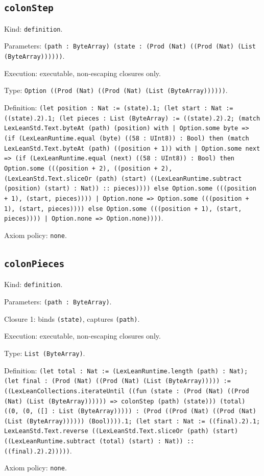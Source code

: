 \documentclass[11pt]{article}
\begin{document}
\subsection*{\texttt{colonStep}}
\noindent Kind: \texttt{definition}.\par
\noindent Parameters: \texttt{(path : ByteArray) (state : (Prod (Nat) ((Prod (Nat) (List (ByteArray))))))}.\par
\noindent Execution: executable, non-escaping closures only.\par
\noindent Type: \texttt{Option ((Prod (Nat) ((Prod (Nat) (List (ByteArray))))))}.\par
\noindent Definition: \texttt{(let position : Nat := (state).1; (let start : Nat := ((state).2).1; (let pieces : List (ByteArray) := ((state).2).2; (match LexLeanStd.Text.byteAt (path) (position) with | Option.some byte => (if (LexLeanRuntime.equal (byte) ((58 : UInt8)) : Bool) then (match LexLeanStd.Text.byteAt (path) ((position + 1)) with | Option.some next => (if (LexLeanRuntime.equal (next) ((58 : UInt8)) : Bool) then Option.some (((position + 2), ((position + 2), (LexLeanStd.Text.sliceOr (path) (start) ((LexLeanRuntime.subtract (position) (start) : Nat)) :: pieces)))) else Option.some (((position + 1), (start, pieces)))) | Option.none => Option.some (((position + 1), (start, pieces)))) else Option.some (((position + 1), (start, pieces)))) | Option.none => Option.none))))}.\par
\noindent Axiom policy: \texttt{none}.\par
\subsection*{\texttt{colonPieces}}
\noindent Kind: \texttt{definition}.\par
\noindent Parameters: \texttt{(path : ByteArray)}.\par
\noindent Closure 1: binds \texttt{(state)}, captures \texttt{(path)}.\par
\noindent Execution: executable, non-escaping closures only.\par
\noindent Type: \texttt{List (ByteArray)}.\par
\noindent Definition: \texttt{(let total : Nat := (LexLeanRuntime.length (path) : Nat); (let final : (Prod (Nat) ((Prod (Nat) (List (ByteArray))))) := ((LexLeanCollections.iterateUntil ((fun (state : (Prod (Nat) ((Prod (Nat) (List (ByteArray)))))) => colonStep (path) (state))) (total) ((0, (0, ([] : List (ByteArray))))) : (Prod ((Prod (Nat) ((Prod (Nat) (List (ByteArray)))))) (Bool)))).1; (let start : Nat := ((final).2).1; LexLeanStd.Text.reverse ((LexLeanStd.Text.sliceOr (path) (start) ((LexLeanRuntime.subtract (total) (start) : Nat)) :: ((final).2).2)))))}.\par
\noindent Axiom policy: \texttt{none}.\par
\end{document}
